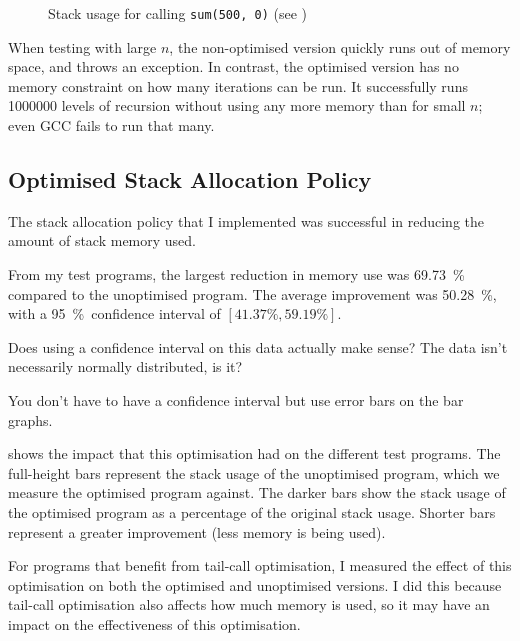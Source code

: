 \documentclass[00-main.tex]{subfiles}
\begin{document}
\begin{figure}[ht]
  \centering
  \caption{Stack usage for calling \texttt{sum(500, 0)} (see )}
  \label{fig:plot:tail-call optimisation stack use}
\end{figure}

When testing with large $n$, the non-optimised version quickly runs out of memory space, and throws an exception.
In contrast, the optimised version has no memory constraint on how many iterations can be run.
It successfully runs \num{1000000} levels of recursion without using any more memory than for small $n$; even GCC fails to run that many.


\subsection{Optimised Stack Allocation Policy}

The stack allocation policy that I implemented was successful in reducing the amount of stack memory used.

From my test programs, the largest reduction in memory use was \SI{69.73}{\percent} compared to the unoptimised program.
The average improvement was \SI{50.28}{\percent}, with a \SI{95}{\percent}~confidence interval of $[41.37\%, 59.19\%]$.

\begin{Comment}
Does using a confidence interval on this data actually make sense? The data isn't necessarily normally distributed, is it?
\end{Comment}

\begin{Comment}
You don't have to have a confidence interval but use error bars on the
bar graphs.
\end{Comment}

 shows the impact that this optimisation had on the different test programs.
The full-height bars represent the stack usage of the unoptimised program, which we measure the optimised program against.
The darker bars show the stack usage of the optimised program as a percentage of the original stack usage.
Shorter bars represent a greater improvement (less memory is being used).

For programs that benefit from tail-call optimisation, I measured the effect of this optimisation on both the optimised and unoptimised versions.
I did this because tail-call optimisation also affects how much memory is used, so it may have an impact on the effectiveness of this optimisation.
\end{document}
